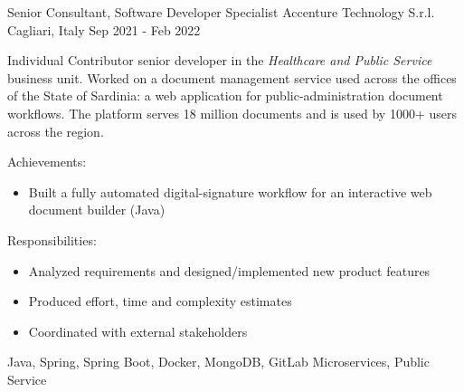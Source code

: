 \begin{cventries}
    \cventryextendedwithdoubletags
    	{Senior Consultant, Software Developer Specialist} %
    	{Accenture Technology S.r.l. } %
    	{Cagliari, Italy} %
    	{Sep 2021 - Feb 2022} %
    	{
    		\begin{cvitem}
			Individual Contributor senior developer in the \textit{Healthcare and Public Service} business unit.
			Worked on a document management service used across the offices of the State of Sardinia: a web application for public-administration document workflows.
			The platform serves 18 million documents and is used by 1000+ users across the region.
			\end{cvitem} 
    	}
    	{
			\begin{cvitems}
				\item Achievements:
					\begin{itemize}
						\item Built a fully automated digital-signature workflow for an interactive web document builder (Java)
					\end{itemize}
				\item Responsibilities:
					\begin{itemize}
						\item Analyzed requirements and designed/implemented new product features
						\item Produced effort, time and complexity estimates
						\item Coordinated with external stakeholders
					\end{itemize}
			\end{cvitems}
    	}
        {Java, Spring, Spring Boot, Docker, MongoDB, GitLab}
		{Microservices, Public Service}


\end{cventries}
